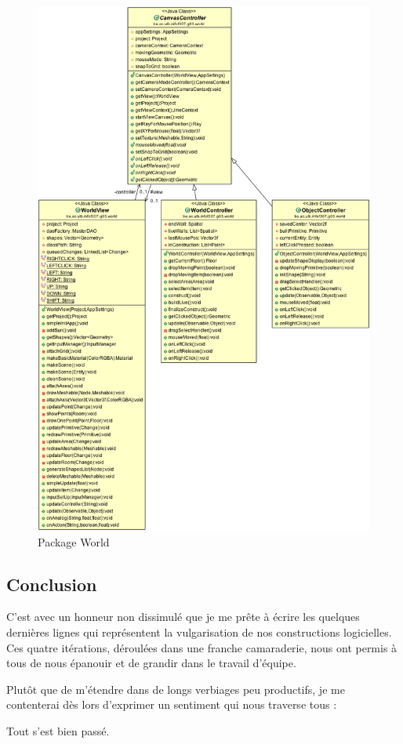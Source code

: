 	\begin{figure}
		\center
		\includegraphics[width=\textwidth]{iteration4/fig/world.png}
		\caption{Package World}
	\end{figure}

\subsection{Conclusion}
C'est avec un honneur non dissimulé que je me prête à écrire les quelques
dernières lignes qui représentent la vulgarisation de nos constructions logicielles.
Ces quatre itérations, déroulées dans une franche camaraderie, nous ont permis
à tous de nous épanouir et de grandir dans le travail d'équipe.

Plutôt que de m'étendre dans de longs verbiages peu productifs, je me contenterai
dès lors d'exprimer un sentiment qui nous traverse tous : 

Tout s'est bien passé.
